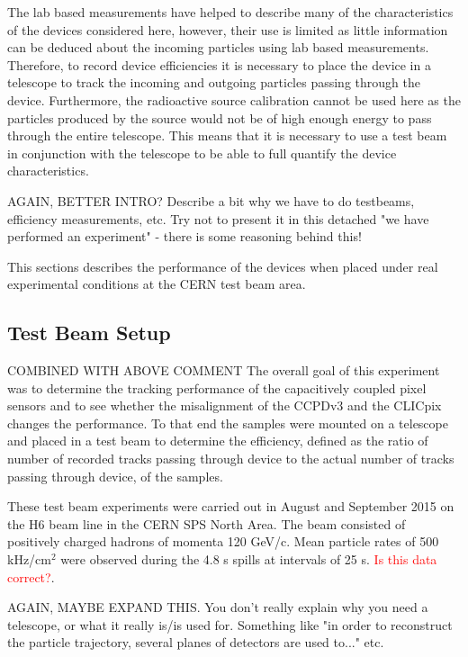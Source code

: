The lab based measurements have helped to describe many of the characteristics of the devices considered here, however, their use is limited as little information can be deduced about the incoming particles using lab based measurements.  Therefore, to record device efficiencies it is necessary to place the device in a telescope to track the incoming and outgoing particles passing through the device.  Furthermore, the radioactive source calibration cannot be used here as the particles produced by the source would not be of high enough energy to pass through the entire telescope.  This means that it is necessary to use a test beam in conjunction with the telescope to be able to full quantify the device characteristics.


AGAIN, BETTER INTRO? Describe a bit why we have to do testbeams, efficiency measurements, etc. Try not to present it in this detached "we have performed an experiment" - there is some reasoning behind this! 

This sections describes the performance of the devices when placed under real experimental conditions at the CERN test beam area.  


\subsection{Test Beam Setup}

COMBINED WITH ABOVE COMMENT
The overall goal of this experiment was to determine the tracking performance of the capacitively coupled pixel sensors and to see whether the misalignment of the CCPDv3 and the CLICpix changes the performance.  To that end the samples were mounted on a telescope and placed in a test beam to determine the efficiency, defined as the ratio of number of recorded tracks passing through device to the actual number of tracks passing through device, of the samples.  

These test beam experiments were carried out in August and September 2015 on the H6 beam line in the CERN SPS North Area.  The beam consisted of positively charged hadrons of momenta 120 GeV/c.  Mean particle rates of 500 kHz/cm$^{2}$ were observed during the 4.8 s spills at intervals of 25 s.  \textcolor{red}{Is this data correct?}.

AGAIN, MAYBE EXPAND THIS. You don't really explain why you need a telescope, or what it really is/is used for. Something like "in order to reconstruct the particle trajectory, several planes of detectors are used to..." etc.

